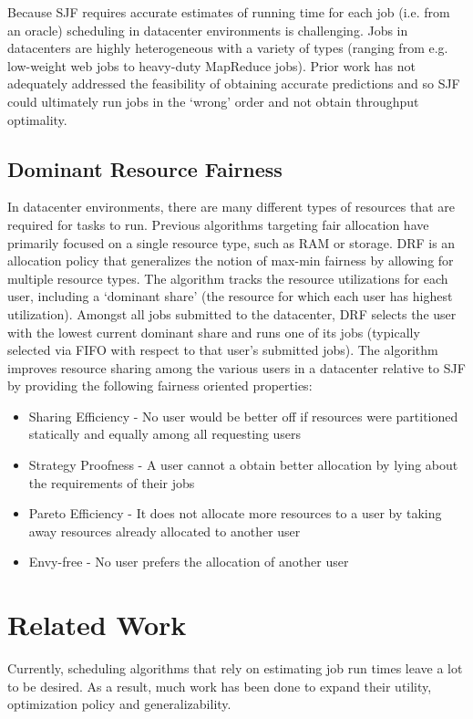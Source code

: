 \documentclass{hotnets19}
\begin{document}
Because SJF requires accurate estimates of running time for each job (i.e. from an oracle) scheduling in datacenter environments is challenging. Jobs in datacenters are highly heterogeneous with a variety of types (ranging from e.g. low-weight web jobs to heavy-duty MapReduce jobs). Prior work has not adequately addressed the feasibility of obtaining accurate predictions and so SJF could ultimately run jobs in the `wrong' order and not obtain throughput optimality.

\subsection{Dominant Resource Fairness}
In datacenter environments, there are many different types of resources that are required for tasks to run. Previous algorithms targeting fair allocation have primarily focused on a single resource type, such as RAM or storage. DRF \cite{ghodsi2011dominant} is an allocation policy that generalizes the notion of max-min fairness by allowing for multiple resource types. The algorithm tracks the resource utilizations for each user, including a `dominant share' (the resource for which each user has highest utilization). Amongst all jobs submitted to the datacenter, DRF selects the user with the lowest current dominant share and runs one of its jobs (typically selected via FIFO with respect to that user's submitted jobs). The algorithm improves resource sharing among the various users in a datacenter relative to SJF by providing the following fairness oriented properties:
\begin{itemize}
    \item Sharing Efficiency - No user would be better off if resources were partitioned statically and equally among all requesting users
    \item Strategy Proofness - A user cannot a obtain better allocation by lying about the requirements of their jobs
    \item Pareto Efficiency - It does not allocate more resources to a user by taking away resources already allocated to another user
    \item Envy-free - No user prefers the allocation of another user
\end{itemize}

\section{Related Work}

Currently, scheduling algorithms that rely on estimating job run times leave a lot to be desired.
As a result, much work has been done to expand their utility, optimization policy and generalizability.
\end{document}
